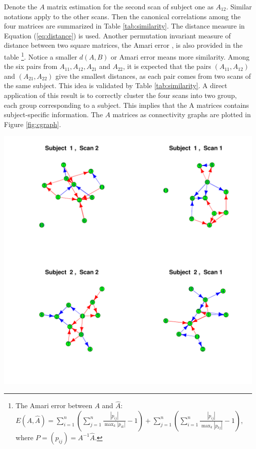 \documentclass[fleqn]{article}
\let\oldref\ref
\renewcommand{\ref}[1]{(\oldref{#1})}
\begin{document}
Denote the $A$ matrix estimation for the second scan of subject one as $A_{12}$. Similar notations apply to the other scans. Then the canonical correlations among the four matrices are summarized in Table \oldref{tab:similarity}. The distance measure in Equation \ref{eq:distance} is used. Another permutation invariant measure of distance between two square matrices, the Amari error \cite{amari1996new}, is also provided in the table \footnote{The Amari error between $A$ and $\hat{A}$: $E(A,\hat{A}) = \sum\limits_{i=1}^n(\sum\limits_{j=1}^n\frac{|p_{ij}|}{\max_k |p_{ik}|}-1) + \sum\limits_{j=1}^n(\sum\limits_{i=1}^n\frac{|p_{ij}|}{\max_k|p_{kj}|}-1)$, where $P =(p_{ij})=A^{-1}\hat{A}$.}. Notice a smaller $d(A,B)$ or Amari error means more similarity. Among the six pairs from $A_{11},A_{12},A_{21}$ and $A_{22}$, it is expected that the pairs $(A_{11},A_{12})$ and $(A_{21},A_{22})$ give the smallest distances, as each pair comes from two scans of the same subject. This idea is validated by Table \oldref{tab:similarity}. A direct application of this result is to correctly cluster the four scans into two group, each group corresponding to a subject. This implies that the A matrices contains subject-specific information. The $A$ matrices as connectivity graphs are plotted in Figure \oldref{fig:cgraph}.
\begin{center}
\includegraphics[scale = 0.85]{./figures/ConnectivityGraph_11_all.pdf}
\label{fig:cgraph}
\end{center}
\end{document}
